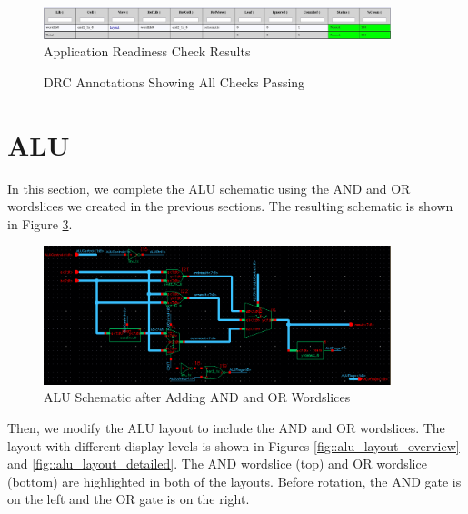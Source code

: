 \documentclass{article}
\begin{document}
	\begin{figure}[H]
		\centerline{\includegraphics[width=0.9\textwidth]{and_application_readiness_check.png}}
		\caption{Application Readiness Check Results}
		\label{fig::or_application_readiness_check}
	\end{figure}
	
	\begin{figure}[H]
		\centerline{}
		\caption{DRC Annotations Showing All Checks Passing}
		\label{fig::or_drc}
	\end{figure}
	
	\section{ALU}
	
	In this section, we complete the ALU schematic using the AND and OR wordslices we created in the previous sections. The resulting schematic is shown in Figure \ref{fig::alu_schematic}.
	
	\begin{figure}[H]
		\centerline{\includegraphics[width=0.9\textwidth]{alu_schematic.png}}
		\caption{ALU Schematic after Adding AND and OR Wordslices}
		\label{fig::alu_schematic}
	\end{figure}
	
	\noindent Then, we modify the ALU layout to include the AND and OR wordslices. The layout with different display levels is shown in Figures \ref{fig::alu_layout_overview} and \ref{fig::alu_layout_detailed}. The AND wordslice (top) and OR wordslice (bottom) are highlighted in both of the layouts. Before rotation, the AND gate is on the left and the OR gate is on the right.
	
\end{document}
